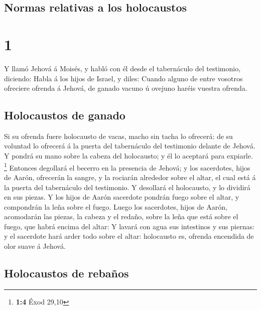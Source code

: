 \hypertarget{normas-relativas-a-los-holocaustos}{%
\subsection{Normas relativas a los
holocaustos}\label{normas-relativas-a-los-holocaustos}}

\hypertarget{section}{%
\section{1}\label{section}}

 Y llamó Jehová á Moisés, y habló con él desde el
tabernáculo del testimonio, diciendo:  Habla á los hijos
de Israel, y diles: Cuando alguno de entre vosotros ofreciere ofrenda á
Jehová, de ganado vacuno ú ovejuno haréis vuestra ofrenda.

\hypertarget{holocaustos-de-ganado}{%
\subsection{Holocaustos de ganado}\label{holocaustos-de-ganado}}

 Si su ofrenda fuere holocausto de vacas, macho sin tacha
lo ofrecerá: de su voluntad lo ofrecerá á la puerta del tabernáculo del
testimonio delante de Jehová.  Y pondrá su mano sobre la
cabeza del holocausto; y él lo aceptará para expiarle. \footnote{\textbf{1:4}
  Éxod 29,10}  Entonces degollará el becerro en la
presencia de Jehová; y los sacerdotes, hijos de Aarón, ofrecerán la
sangre, y la rociarán alrededor sobre el altar, el cual está á la puerta
del tabernáculo del testimonio.  Y desollará el
holocausto, y lo dividirá en sus piezas.  Y los hijos de
Aarón sacerdote pondrán fuego sobre el altar, y compondrán la leña sobre
el fuego.  Luego los sacerdotes, hijos de Aarón,
acomodarán las piezas, la cabeza y el redaño, sobre la leña que está
sobre el fuego, que habrá encima del altar:  Y lavará con
agua sus intestinos y sus piernas: y el sacerdote hará arder todo sobre
el altar: holocausto es, ofrenda encendida de olor suave á Jehová.

\hypertarget{holocaustos-de-rebauxf1os}{%
\subsection{Holocaustos de rebaños}\label{holocaustos-de-rebauxf1os}}

